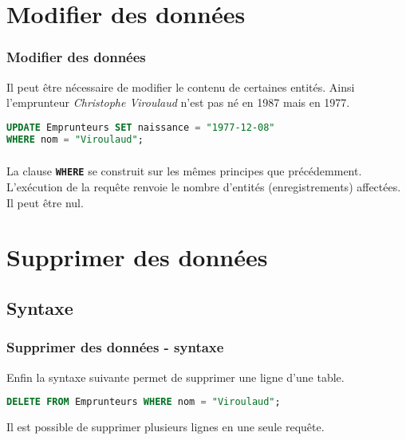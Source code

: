 \documentclass[svgnames,11pt]{beamer}
\begin{document}
\section{Modifier des données}
\begin{frame}[fragile]
    \frametitle{Modifier des données}

    Il peut être nécessaire de modifier le contenu de certaines entités. Ainsi l'emprunteur \emph{Christophe Viroulaud} n'est pas né en 1987 mais en 1977.
    \begin{center}
        \begin{lstlisting}[language=SQL , basicstyle=\ttfamily\small, xleftmargin=1em, xrightmargin=-1em]
UPDATE Emprunteurs SET naissance = "1977-12-08" 
WHERE nom = "Viroulaud";
\end{lstlisting}
        \label{update}
    \end{center}

\end{frame}
\begin{frame}
    \frametitle{}

    La clause \texttt{\textbf{WHERE}} se construit sur les mêmes principes que précédemment. L'exécution de la requête renvoie le nombre d'entités (enregistrements) affectées. Il peut être nul.

\end{frame}
\section{Supprimer des données}
\subsection{Syntaxe}
\begin{frame}[fragile]
    \frametitle{Supprimer des données - syntaxe}
    Enfin la syntaxe suivante permet de supprimer une ligne d'une table.
    \begin{center}
        \begin{lstlisting}[language=SQL , basicstyle=\ttfamily\small, xleftmargin=1em, xrightmargin=-1em]
DELETE FROM Emprunteurs WHERE nom = "Viroulaud";
\end{lstlisting}
        \label{delete}
    \end{center}

    \begin{aretenir}[Remarque]
        Il est possible de supprimer plusieurs lignes en une seule requête.
    \end{aretenir}
\end{frame}
\end{document}
